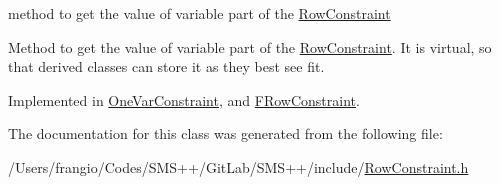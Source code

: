 method to get the value of variable part of the \mbox{\hyperlink{class_s_m_spp__di__unipi__it_1_1_row_constraint}{Row\+Constraint}} 

Method to get the value of variable part of the \mbox{\hyperlink{class_s_m_spp__di__unipi__it_1_1_row_constraint}{Row\+Constraint}}. It is virtual, so that derived classes can store it as they best see fit. 

Implemented in \mbox{\hyperlink{class_s_m_spp__di__unipi__it_1_1_one_var_constraint_ad9256be16b98f3b557f54fa5e2118db7}{One\+Var\+Constraint}}, and \mbox{\hyperlink{class_s_m_spp__di__unipi__it_1_1_f_row_constraint_ad9256be16b98f3b557f54fa5e2118db7}{F\+Row\+Constraint}}.



The documentation for this class was generated from the following file\+:\begin{DoxyCompactItemize}
\item 
/\+Users/frangio/\+Codes/\+S\+M\+S++/\+Git\+Lab/\+S\+M\+S++/include/\mbox{\hyperlink{_row_constraint_8h}{Row\+Constraint.\+h}}\end{DoxyCompactItemize}
